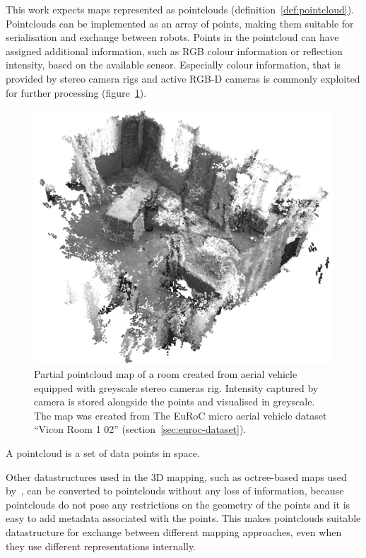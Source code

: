 This work expects maps represented as pointclouds (definition~\ref{def:pointcloud}). Pointclouds can be implemented as an array of points, making them suitable for serialisation and exchange between robots. Points in the pointcloud can have assigned additional information, such as \gls{RGB} colour information or reflection intensity, based on the available sensor. Especially colour information, that is provided by stereo camera rigs and active \gls{RGB-D} cameras is commonly exploited for further processing (figure~\ref{fig:v1-greyscale}).

\begin{figure}
    \centering
    \includegraphics[width=\textwidth]{../img/v1-greyscale.png}
    \caption[Pointcloud map with greyscale colours]{Partial pointcloud map of a room created from aerial vehicle equipped with greyscale stereo cameras rig. Intensity captured by camera is stored alongside the points and visualised in greyscale. The map was created from The EuRoC micro aerial vehicle dataset ``Vicon Room 1 02'' (section~\ref{sec:euroc-dataset}).}
    \label{fig:v1-greyscale}
\end{figure}

\begin{defn}[Pointcloud]
\label{def:pointcloud}
A pointcloud is a set of data points in space.
\end{defn}

Other datastructures used in the \gls{3D} mapping, such as octree-based maps used by~\citet{hornung2013octomap}, can be converted to pointclouds without any loss of information, because pointclouds do not pose any restrictions on the geometry of the points and it is easy to add metadata associated with the points. This makes pointclouds suitable datastructure for exchange between different mapping approaches, even when they use different representations internally.

